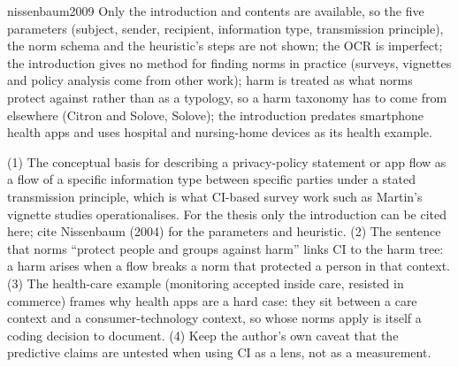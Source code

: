 \begin{papercard}{nissenbaum2009}
 Only the introduction and contents are available, so the five parameters (subject, sender, recipient, information type, transmission principle), the norm schema and the heuristic's steps are not shown; the OCR is imperfect; the introduction gives no method for finding norms in practice (surveys, vignettes and policy analysis come from other work); harm is treated as what norms protect against rather than as a typology, so a harm taxonomy has to come from elsewhere (Citron and Solove, Solove); the introduction predates smartphone health apps and uses hospital and nursing-home devices as its health example.

 (1) The conceptual basis for describing a privacy-policy statement or app flow as a flow of a specific information type between specific parties under a stated transmission principle, which is what CI-based survey work such as Martin's vignette studies operationalises. For the thesis only the introduction can be cited here; cite Nissenbaum (2004) for the parameters and heuristic. (2) The sentence that norms ``protect people and groups against harm'' links CI to the harm tree: a harm arises when a flow breaks a norm that protected a person in that context. (3) The health-care example (monitoring accepted inside care, resisted in commerce) frames why health apps are a hard case: they sit between a care context and a consumer-technology context, so whose norms apply is itself a coding decision to document. (4) Keep the author's own caveat that the predictive claims are untested when using CI as a lens, not as a measurement.
\end{papercard}
